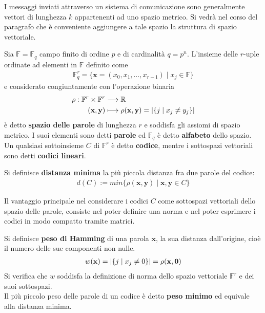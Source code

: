 I messaggi inviati attraverso un sistema di comunicazione sono generalmente vettori di lunghezza $k$ appartenenti ad uno spazio metrico. Si vedrà nel corso del paragrafo che è conveniente aggiungere a tale spazio la struttura di spazio vettoriale.
\begin{definizione}
   Sia $\mathbb{F} = \mathbb{F}_{q}$ campo finito di ordine $p$ e di cardinalità $q=p^n$. L'insieme delle $r$-uple ordinate ad elementi in $\mathbb{F}$ definito come
   \begin{align*}
      \mathbb{F}_{q}^{r} = \lbrace \mathbf{x} = (x_{0},x_{1}, \dots , x_{r-1}) \mid x_{j} \in \mathbb{F} \rbrace
   \end{align*}
   e considerato congiuntamente con l'operazione binaria
   \begin{align*}
       \rho: \mathbb{F}^{r} \times \mathbb{F}^{r}  &\longrightarrow  \mathbb{R}   \\
              (\mathbf{x},\mathbf{y}) &\longmapsto  \rho(\mathbf{x},\mathbf{y})
              = \arrowvert \lbrace j \mid x_j \neq y_j \rbrace \arrowvert
   \end{align*}
   è detto {\bf spazio delle parole} di lunghezza $r$ e soddisfa gli assiomi di spazio metrico. I suoi elementi sono detti {\bf parole} ed $\mathbb{F}_{q}$ è detto {\bf alfabeto} dello spazio. \\
   Un qualsiasi sottoinsieme $C$ di $\mathbb{F}^{r} $ è detto {\bf codice}, mentre i sottospazi vettoriali sono detti {\bf codici lineari}.
\end{definizione}
\begin{definizione}
   Si definisce {\bf distanza minima} la più piccola distanza fra due parole del codice:
   \begin{align*}
      d(C)
      := min\lbrace  \rho(\mathbf{x},\mathbf{y})    \mid \mathbf{x},\mathbf{y} \in C \rbrace
   \end{align*}
\end{definizione}
\noindent
Il vantaggio principale nel considerare i codici $C$ come sottospazi vettoriali dello spazio delle parole, consiste nel poter definire una norma e nel poter esprimere i codici in modo compatto tramite matrici.
\begin{definizione}
   Si definisce {\bf peso di Hamming} di una parola $\mathbf{x}$, la sua distanza dall'origine, cioè il numero delle sue componenti non nulle.
   \begin{align*}
      w(\mathbf{x}) = \arrowvert \lbrace j \mid x_j \neq 0 \rbrace \arrowvert = \rho(\mathbf{x},\mathbf{0})
   \end{align*}
   Si verifica che $w$ soddisfa la definizione di norma dello spazio vettoriale $\mathbb{F}^{r}$ e dei suoi sottospazi.\\
   Il più piccolo peso delle parole di un codice è detto {\bf peso minimo} ed equivale alla distanza minima.
\end{definizione}
